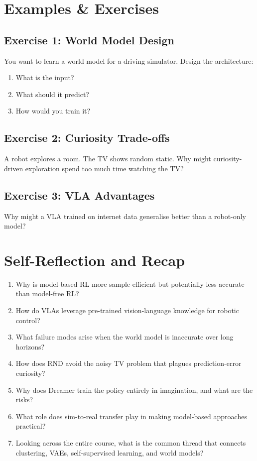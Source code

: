 \newpage
\section{Examples \& Exercises}

\subsection{Exercise 1: World Model Design}

You want to learn a world model for a driving simulator. Design the architecture:
\begin{enumerate}
    \item What is the input?
    \item What should it predict?
    \item How would you train it?
\end{enumerate}

\subsection{Exercise 2: Curiosity Trade-offs}

A robot explores a room. The TV shows random static. Why might curiosity-driven exploration spend too much time watching the TV?

\subsection{Exercise 3: VLA Advantages}

Why might a VLA trained on internet data generalise better than a robot-only model?


\section{Self-Reflection and Recap}


\begin{enumerate}
    \item Why is model-based RL more sample-efficient but potentially less accurate than model-free RL?
    \item How do VLAs leverage pre-trained vision-language knowledge for robotic control?
    \item What failure modes arise when the world model is inaccurate over long horizons?
    \item How does RND avoid the noisy TV problem that plagues prediction-error curiosity?
    \item Why does Dreamer train the policy entirely in imagination, and what are the risks?
    \item What role does sim-to-real transfer play in making model-based approaches practical?
    \item Looking across the entire course, what is the common thread that connects clustering, VAEs, self-supervised learning, and world models?
\end{enumerate}

